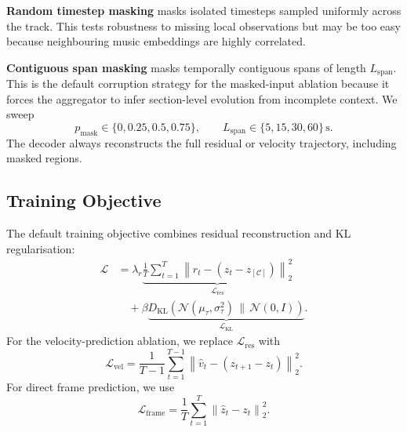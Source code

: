 \documentclass{article}
\newcommand{\zC}{z_{[\mathcal{C}]}}    %
\newcommand{\KL}{D_{\mathrm{KL}}}
\begin{document}
\textbf{Random timestep masking} masks isolated timesteps sampled
uniformly across the track.  This tests robustness to missing
local observations but may be too easy because neighbouring music
embeddings are highly correlated.

\textbf{Contiguous span masking} masks temporally contiguous spans
of length $L_{\mathrm{span}}$.  This is the default corruption
strategy for the masked-input ablation because it forces the
aggregator to infer section-level evolution from incomplete
context.  We sweep
%
\begin{equation}
  p_{\mathrm{mask}} \in \{0, 0.25, 0.5, 0.75\},
  \qquad
  L_{\mathrm{span}} \in \{5,15,30,60\}\,\mathrm{s}.
  \label{eq:mask_sweep}
\end{equation}
%
The decoder always reconstructs the full residual or velocity
trajectory, including masked regions.

\subsection{Training Objective}
\label{ssec:train}

The default training objective combines residual reconstruction and
KL regularisation:
%
\begin{align}
  \mathcal{L}
  &=
  \lambda_r
  \underbrace{
    \frac{1}{T}
    \sum_{t=1}^{T}
    \left\|
    \hat{r}_t - (z_t-\zC)
    \right\|_2^2
  }_{\mathcal{L}_{\mathrm{res}}}
  \nonumber\\
  &\quad
  + \beta
  \underbrace{
    \KL\!\left(
      \mathcal{N}(\mu_\tau,\sigma_\tau^2)
      \,\|\, \mathcal{N}(0,I)
    \right)
  }_{\mathcal{L}_{\mathrm{KL}}}.
  \label{eq:default_loss}
\end{align}
%
For the velocity-prediction ablation, we replace
$\mathcal{L}_{\mathrm{res}}$ with
%
\begin{equation}
  \mathcal{L}_{\mathrm{vel}}
  =
  \frac{1}{T-1}
  \sum_{t=1}^{T-1}
  \left\|
  \hat{v}_t - (z_{t+1}-z_t)
  \right\|_2^2.
  \label{eq:vel_loss}
\end{equation}
%
For direct frame prediction, we use
%
\begin{equation}
  \mathcal{L}_{\mathrm{frame}}
  =
  \frac{1}{T}
  \sum_{t=1}^{T}
  \left\|
  \hat{z}_t - z_t
  \right\|_2^2.
  \label{eq:frame_loss}
\end{equation}
%

\end{document}
